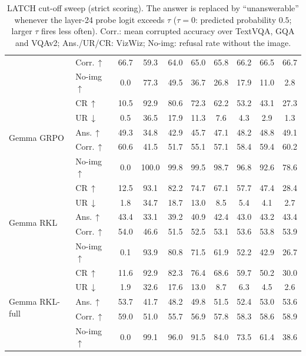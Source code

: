 \begin{table}[t]
\begin{tabular}{llcccccccc}
 & Corr.\,$\uparrow$ & 66.7 & 59.3 & 64.0 & 65.0 & 65.8 & 66.2 & 66.5 & 66.7 \\
 & No-img\,$\uparrow$ & 0.0 & 77.3 & 49.5 & 36.7 & 26.8 & 17.9 & 11.0 & 2.8 \\
\midrule
\multirow{5}{*}{Gemma GRPO} & CR\,$\uparrow$ & 10.5 & 92.9 & 80.6 & 72.3 & 62.2 & 53.2 & 43.1 & 27.3 \\
 & UR\,$\downarrow$ & 0.5 & 36.5 & 17.9 & 11.3 & 7.6 & 4.3 & 2.9 & 1.3 \\
 & Ans.\,$\uparrow$ & 49.3 & 34.8 & 42.9 & 45.7 & 47.1 & 48.2 & 48.8 & 49.1 \\
 & Corr.\,$\uparrow$ & 60.6 & 41.5 & 51.7 & 55.1 & 57.1 & 58.4 & 59.4 & 60.2 \\
 & No-img\,$\uparrow$ & 0.0 & 100.0 & 99.8 & 99.5 & 98.7 & 96.8 & 92.6 & 78.6 \\
\midrule
\multirow{5}{*}{Gemma RKL} & CR\,$\uparrow$ & 12.5 & 93.1 & 82.2 & 74.7 & 67.1 & 57.7 & 47.4 & 28.4 \\
 & UR\,$\downarrow$ & 1.8 & 34.7 & 18.7 & 13.0 & 8.5 & 5.4 & 4.1 & 2.7 \\
 & Ans.\,$\uparrow$ & 43.4 & 33.1 & 39.2 & 40.9 & 42.4 & 43.0 & 43.2 & 43.4 \\
 & Corr.\,$\uparrow$ & 54.0 & 46.6 & 51.5 & 52.5 & 53.1 & 53.6 & 53.8 & 53.9 \\
 & No-img\,$\uparrow$ & 0.1 & 93.9 & 80.8 & 71.5 & 61.9 & 52.2 & 42.9 & 26.7 \\
\midrule
\multirow{5}{*}{Gemma RKL-full} & CR\,$\uparrow$ & 11.6 & 92.9 & 82.3 & 76.4 & 68.6 & 59.7 & 50.2 & 30.0 \\
 & UR\,$\downarrow$ & 1.9 & 32.6 & 17.6 & 13.0 & 8.7 & 6.3 & 4.5 & 2.6 \\
 & Ans.\,$\uparrow$ & 53.7 & 41.7 & 48.2 & 49.8 & 51.5 & 52.4 & 53.0 & 53.6 \\
 & Corr.\,$\uparrow$ & 59.0 & 51.0 & 55.7 & 56.9 & 57.8 & 58.3 & 58.6 & 58.9 \\
 & No-img\,$\uparrow$ & 0.0 & 99.1 & 96.0 & 91.5 & 84.0 & 73.5 & 61.4 & 38.6 \\
\bottomrule
\end{tabular}
\caption{LATCH cut-off sweep (strict scoring). The answer is replaced by ``unanswerable'' whenever the layer-24 probe logit exceeds $\tau$ ($\tau{=}0$: predicted probability $0.5$; larger $\tau$ fires less often). Corr.: mean corrupted accuracy over TextVQA, GQA and VQAv2; Ans./UR/CR: VizWiz; No-img: refusal rate without the image.}
\label{tab:supp_probe_tau}
\end{table}

